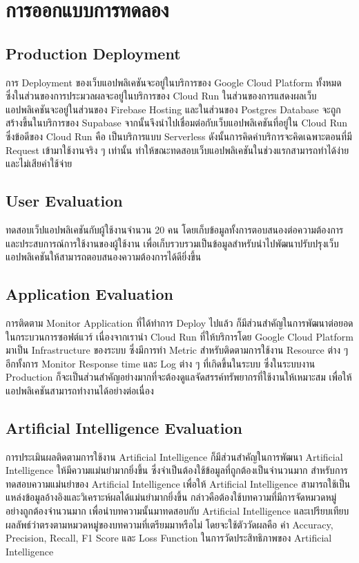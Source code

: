 \documentclass[12pt,oneside,openright,a4paper]{cpe-thai-project}
\begin{document}
\section{การออกแบบการทดลอง}
\subsection{Production Deployment}
\hspace*{1cm}การ Deployment ของเว็บแอปพลิเคชันจะอยู่ในบริการของ Google Cloud Platform ทั้งหมด ซึ่งในส่วนของการประมวลผลจะอยู่ในบริการของ Cloud Run 
ในส่วนของการแสดงผลเว็บแอปพลิเคชันจะอยู่ในส่วนของ Firebase Hosting และในส่วนของ Postgres Database จะถูกสร้างขึ้นในบริการของ Supabase 
จากนั้นจึงนำไปเชื่อมต่อกับเว็บแอปพลิเคชันที่อยู่ใน Cloud Run ซึ่งข้อดีของ Cloud Run คือ เป็นบริการแบบ Serverless 
ดังนั้นการคิดค่าบริการจะคิดเฉพาะตอนที่มี Request เข้ามาใช้งานจริง ๆ เท่านั้น ทำให้ขณะทดสอบเว็บแอปพลิเคชันในช่วงแรกสามารถทำได้ง่ายและไม่เสียค่าใช้จ่าย
\subsection{User Evaluation}
\hspace*{1cm}ทดสอบเว็ปแอปพลิเคชันกับผู้ใช้งานจำนวน 20 คน โดยเก็บข้อมูลทั้งการตอบสนองต่อความต้องการและประสบการณ์การใช้งานของผู้ใช้งาน 
เพื่อเก็บรวบรวมเป็นข้อมูลสำหรับนำไปพัฒนาปรับปรุงเว็บแอปพลิเคชันให้สามารถตอบสนองความต้องการได้ดียิ่งขึ้น
\subsection{Application Evaluation}
\hspace*{1cm}การติดตาม Monitor Application ที่ได้ทำการ Deploy ไปแล้ว ก็มีส่วนสำคัญในการพัฒนาต่อยอดในกระบวนการซอฟต์แวร์ 
เนื่องจากเรานำ Cloud Run ที่ให้บริการโดย Google Cloud Platform มาเป็น Infrastructure ของระบบ ซึ่งมีการทำ Metric 
สำหรับติดตามการใช้งาน Resource ต่าง ๆ อีกทั้งการ Monitor Response time และ Log ต่าง ๆ ที่เกิดขึ้นในระบบ 
ซึ่งในระบบงาน Production ก็จะเป็นส่วนสำคัญอย่างมากที่จะต้องดูแลจัดสรรค์ทรัพยากรที่ใช้งานให้เหมาะสม เพื่อให้แอปพลิเคชันสามารถทำงานได้อย่างต่อเนื่อง
\subsection{Artificial Intelligence Evaluation}
\hspace*{1cm}การประเมินผลติดตามการใช้งาน Artificial Intelligence ก็มีส่วนสำคัญในการพัฒนา Artificial Intelligence ให้มีความแม่นยำมากยิ่งขึ้น 
ซึ่งจำเป็นต้องใช้ข้อมูลที่ถูกต้องเป็นจำนวนมาก สำหรับการทดสอบความแม่นยำของ Artificial Intelligence เพื่อให้ Artificial Intelligence สามารถใช้เป็นแหล่งข้อมูลอ้างอิงและวิเคราะห์ผลได้แม่นยำมากยิ่งขึ้น
กล่าวคือต้องใช้บทความที่มีการจัดหมวดหมู่อย่างถูกต้องจำนวนมาก เพื่อนำบทความนั้นมาทดสอบกับ Artificial Intelligence และเปรียบเทียบผลลัพธ์ว่าตรงตามหมวดหมู่ของบทความที่เตรียมมาหรือไม่
โดยจะใช้ตัววัดผลคือ ค่า Accuracy, Precision, Recall, F1 Score และ Loss Function ในการวัดประสิทธิภาพของ Artificial Intelligence
\end{document}
